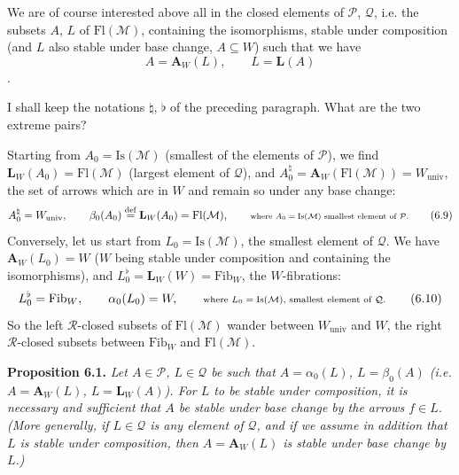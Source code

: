 \documentclass[11pt]{article}
\newcommand{\printedpage}[1]{\marginpar{\footnotesize p.~#1}}
\newcommand{\msp}[1]{\marginpar{\footnotesize [#1]}}
\newcommand{\Fl}{\mathrm{Fl}}
\newcommand{\Is}{\mathrm{Is}}
\newcommand{\Fib}{\mathrm{Fib}}
\begin{document}
\printedpage{54}
We are of course interested above all in the closed elements of $\mathcal{P}$, $\mathcal{Q}$, i.e. the subsets $A$, $L$ of $\Fl(\mathcal{M})$, containing the isomorphisms, stable under composition (and $L$ also stable under base change, $A \subseteq W$) such that we have
\[
A = \mathbf{A}_W(L), \qquad L = \mathbf{L}(A) \tag*{(6.8)}
\]
.

\msp{page 87}

I shall keep the notations $\natural$, $\flat$ of the preceding paragraph. What are the two extreme pairs?

Starting from $A_0 = \Is(\mathcal{M})$ (smallest of the elements of $\mathcal{P}$), we find $\mathbf{L}_W(A_0) = \Fl(\mathcal{M})$ (largest element of $\mathcal{Q}$), and $A_0^{\natural} = \mathbf{A}_W(\Fl(\mathcal{M})) = W_{\mathrm{univ}}$, the set of arrows which are in $W$ and remain so under any base change:
\[
A_0^{\natural} = W_{\mathrm{univ}}, \qquad \beta_0(A_0) \overset{\text{def}}{=} \mathbf{L}_W(A_0) = \Fl(\mathcal{M}), \qquad \text{\scriptsize where $A_0 = \Is(\mathcal{M})$ smallest element of $\mathcal{P}$.} \tag*{(6.9)}
\]
Conversely, let us start from $L_0 = \Is(\mathcal{M})$, the smallest element of $\mathcal{Q}$. We have $\mathbf{A}_W(L_0) = W$ ($W$ being stable under composition and containing the isomorphisms), and $L_0^{\flat} = \mathbf{L}_W(W) = \Fib_W$, the $W$-fibrations:
\[
L_0^{\flat} = \Fib_W, \qquad \alpha_0(L_0) = W, \qquad \text{\scriptsize where $L_0 = \Is(\mathcal{M})$, smallest element of $\mathcal{Q}$.} \tag*{(6.10)}
\]
So the left $\mathcal{R}$-closed subsets of $\Fl(\mathcal{M})$ wander between $W_{\mathrm{univ}}$ and $W$, the right $\mathcal{R}$-closed subsets between $\Fib_W$ and $\Fl(\mathcal{M})$.

\textbf{Proposition 6.1.} \textit{Let $A \in \mathcal{P}$, $L \in \mathcal{Q}$ be such that $A = \alpha_0(L)$, $L = \beta_0(A)$ (i.e. $A = \mathbf{A}_W(L)$, $L = \mathbf{L}_W(A)$). For $L$ to be stable under composition, it is necessary and sufficient that $A$ be stable under base change by the arrows $f \in L$. (More generally, if $L \in \mathcal{Q}$ is any element of $\mathcal{Q}$, and if we assume in} \msp{page 88} \textit{addition that $L$ is stable under composition, then $A = \mathbf{A}_W(L)$ is stable under base change by $L$.)}
\end{document}
